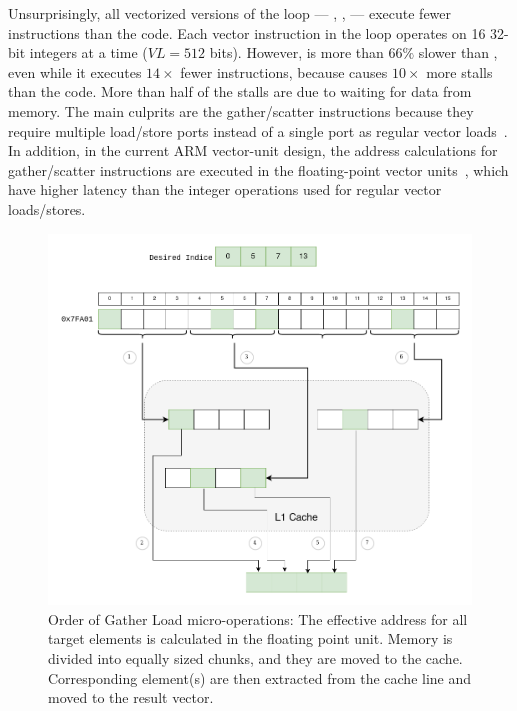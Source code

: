 Unsurprisingly, all vectorized versions of the loop --- \ifconv, \ALC, \ALC  --- execute fewer instructions than the \scalar code.
Each vector instruction in the loop operates on 16 32-bit integers at a time ($VL = 512$ bits).
However, \ALC is more than $66\%$ slower than \scalar, even while it executes $14\times$ fewer instructions, because \ALC causes $10\times$ more stalls than the \scalar code.
More than half of the stalls are due to waiting for data from memory.
The main culprits are the gather/scatter instructions because they require multiple load/store ports instead of a single port as regular vector loads~\cite{A64FXmanual}.
In addition, in the current ARM vector-unit design, the address calculations for gather/scatter instructions are executed in the floating-point vector units~\cite{A64FXmanual}, which have higher latency than the integer operations used for regular vector loads/stores.



\begin{figure}[t]
\includegraphics[width=\textwidth]{Figures/03-approach/Gather load.drawio.png}
\centering
\caption{ Order of Gather Load micro-operations: The effective address for all target elements is calculated in the floating point unit. Memory is divided into equally sized chunks, and they are moved to the cache. Corresponding element(s) are then extracted from the cache line and moved to the result vector.}
\label{fig:gather-load}
\end{figure}

